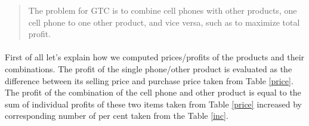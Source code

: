 \begin{quote}The problem for GTC is to combine cell phones with other products, one cell
phone to one other product, and vice versa, such as to maximize total profit.\end{quote}

	\paragraph{}
	First of all let's explain how we computed prices/profits of the products and their combinations. The profit of the single phone/other product is evaluated as the difference between its selling price and purchase price taken from Table \ref{price}. The profit of the combination of the cell phone and other product is equal to the sum of individual profits of these two items taken from Table \ref{price} increased by corresponding number of per cent taken from the Table \ref{inc}.


